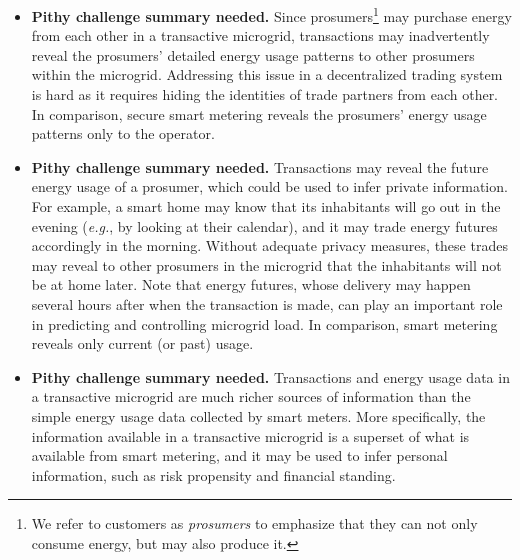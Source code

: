 \begin{itemize}[itemsep=0.25\parskip,topsep=-0.5\parskip]
\item \textbf{Pithy challenge summary needed.} 
 Since prosumers\footnote{We
  refer to customers as \emph{prosumers} to emphasize that they can
  not only consume energy, but may also produce it.} may purchase
  energy from each other in a transactive microgrid, transactions may
  inadvertently reveal the prosumers' detailed energy usage patterns
  to other prosumers within the microgrid.  Addressing this issue in a
  decentralized trading system is hard as it requires hiding the
  identities of trade partners from each other. In comparison, secure
  smart metering reveals the prosumers' energy usage patterns only to
  the operator.

\item \textbf{Pithy challenge summary needed.} 
   Transactions may reveal
  the future energy usage of a prosumer, which could be used to infer
  private information.  For example, a smart home may know that its
  inhabitants will go out in the evening (\emph{e.g.}, by looking at
  their calendar), and it may trade energy futures accordingly in the
  morning.  Without adequate privacy measures, these trades may reveal
  to other prosumers in the microgrid that the inhabitants will not be
  at home later.  Note that energy
  futures, whose delivery may happen several hours after when the
  transaction is made, can play an important role in predicting and
  controlling microgrid load.  In comparison, smart metering reveals
  only current (or past) usage.

\item \textbf{Pithy challenge summary needed.} 
  Transactions and energy
  usage data in a transactive microgrid are much richer sources of
  information than the simple energy usage data collected by smart
  meters.  More specifically, the information available in a
  transactive microgrid is a superset of what is available from smart
  metering, and it may be used to infer personal information, such as
  risk propensity and financial standing.
\end{itemize}
\vspace{0.5\parskip}

